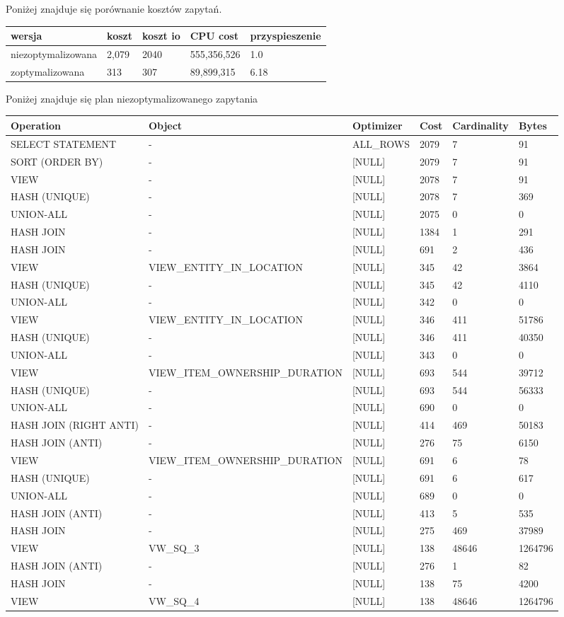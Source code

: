 \documentclass[11pt]{article}
\numberwithin{figure}{subsection}
\begin{document}
		Poniżej znajduje się porównanie kosztów zapytań.
		
		\begin{tabularx}{\textwidth}{|X|X|X|X|X|}
			\hline
			wersja & koszt & koszt io & CPU cost & przyspieszenie \\
			\hline
			niezoptymalizowana & 2,079 & 2040 & 555,356,526 & 1.0 \\
			\hline
			zoptymalizowana & 313 & 307 & 89,899,315 & 6.18 \\
			\hline
		\end{tabularx}
		
		Poniżej znajduje się plan niezoptymalizowanego zapytania \\
		
		\begin{tabularx}{\textwidth}{|X|X|X|X|X|X|}
Operation&Object&Optimizer&Cost&Cardinality&Bytes\\ \hline
SELECT STATEMENT& - &ALL\_ROWS&2079&7&91\\ \hline
SORT (ORDER BY)& - &[NULL]&2079&7&91\\ \hline
VIEW& - &[NULL]&2078&7&91\\ \hline
HASH (UNIQUE)& - &[NULL]&2078&7&369\\ \hline
UNION-ALL& - &[NULL]&2075&0&0\\ \hline
HASH JOIN& - &[NULL]&1384&1&291\\ \hline
HASH JOIN& - &[NULL]&691&2&436\\ \hline
VIEW&VIEW\_ENTITY\_IN\_LOCATION&[NULL]&345&42&3864\\ \hline
HASH (UNIQUE)& - &[NULL]&345&42&4110\\ \hline
UNION-ALL& - &[NULL]&342&0&0\\ \hline
VIEW&VIEW\_ENTITY\_IN\_LOCATION&[NULL]&346&411&51786\\ \hline
HASH (UNIQUE)& - &[NULL]&346&411&40350\\ \hline
UNION-ALL& - &[NULL]&343&0&0\\ \hline
VIEW&VIEW\_ITEM\_OWNERSHIP\_DURATION&[NULL]&693&544&39712\\ \hline
HASH (UNIQUE)& - &[NULL]&693&544&56333\\ \hline
UNION-ALL& - &[NULL]&690&0&0\\ \hline
HASH JOIN (RIGHT ANTI)& - &[NULL]&414&469&50183\\ \hline
HASH JOIN (ANTI)& - &[NULL]&276&75&6150\\ \hline
VIEW&VIEW\_ITEM\_OWNERSHIP\_DURATION&[NULL]&691&6&78\\ \hline
HASH (UNIQUE)& - &[NULL]&691&6&617\\ \hline
UNION-ALL& - &[NULL]&689&0&0\\ \hline
HASH JOIN (ANTI)& - &[NULL]&413&5&535\\ \hline
HASH JOIN& - &[NULL]&275&469&37989\\ \hline
VIEW&VW\_SQ\_3&[NULL]&138&48646&1264796\\ \hline
HASH JOIN (ANTI)& - &[NULL]&276&1&82\\ \hline
HASH JOIN& - &[NULL]&138&75&4200\\ \hline
VIEW&VW\_SQ\_4&[NULL]&138&48646&1264796\\ \hline
		\end{tabularx}
		
\end{document}
